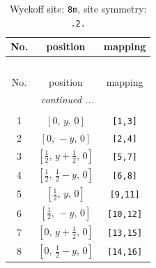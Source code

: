 \documentclass[fleqn,8pt]{jsarticle}
\begin{document}
\begin{longtable}{ccc}
\caption{Wyckoff site: {\tt 8m}, site symmetry: {\tt .2.}}
 \\
 \hline \hline
No. & position & mapping \\ \hline \endfirsthead

\multicolumn{2}{l}{\tablename\ \thetable{}} \\
 \hline \hline
No. & position & mapping \\ \hline \endhead

 \hline \hline
\multicolumn{2}{r}{\footnotesize\it continued ...} \\ \endfoot

 \hline \hline
\multicolumn{2}{r}{} \\ \endlastfoot

1 & $\left[ 0,\, y,\, 0 \right]$ & {\tt [1,3]} \\ \hline
2 & $\left[ 0,\, - y,\, 0 \right]$ & {\tt [2,4]} \\ \hline
3 & $\left[ \frac{1}{2},\, y + \frac{1}{2},\, 0 \right]$ & {\tt [5,7]} \\ \hline
4 & $\left[ \frac{1}{2},\, \frac{1}{2} - y,\, 0 \right]$ & {\tt [6,8]} \\ \hline
5 & $\left[ \frac{1}{2},\, y,\, 0 \right]$ & {\tt [9,11]} \\ \hline
6 & $\left[ \frac{1}{2},\, - y,\, 0 \right]$ & {\tt [10,12]} \\ \hline
7 & $\left[ 0,\, y + \frac{1}{2},\, 0 \right]$ & {\tt [13,15]} \\ \hline
8 & $\left[ 0,\, \frac{1}{2} - y,\, 0 \right]$ & {\tt [14,16]} \\
\end{longtable}
\renewcommand{\arraystretch}{1.2}
\end{document}
